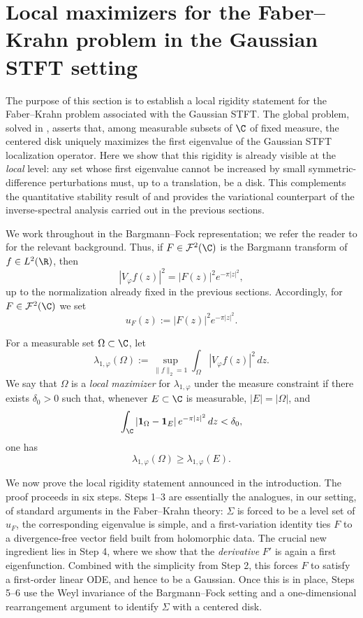 \section{Local maximizers for the Faber--Krahn problem in the Gaussian STFT setting}\label{sec:local-max}

The purpose of this section is to establish a local rigidity statement for the
Faber--Krahn problem associated with the Gaussian STFT. The global problem,
solved in \cite{Nicola-Tilli}, asserts that, among measurable subsets of \(\C\)
of fixed measure, the centered disk uniquely maximizes the first eigenvalue of
the Gaussian STFT localization operator. Here we show that this rigidity is
already visible at the \emph{local} level: any set whose first eigenvalue cannot
be increased by small symmetric-difference perturbations must, up to a
translation, be a disk. This complements the quantitative stability result of
\cite{Gomez-Guerra-Ramos-Tilli} and provides the variational counterpart of the
inverse-spectral analysis carried out in the previous sections.

We work throughout in the Bargmann--Fock representation; we refer the reader to
\cite{Bargmann,Folland,Grochenig} for the relevant background. Thus, if
\(F\in \mathcal F^2(\C)\) is the Bargmann transform of \(f\in L^2(\R)\), then
\[
|V_\varphi f(z)|^2 = |F(z)|^2 e^{-\pi |z|^2},
\]
up to the normalization already fixed in the previous sections. Accordingly, for
\(F\in \mathcal F^2(\C)\) we set
\[
u_F(z):=|F(z)|^2 e^{-\pi |z|^2}.
\]

For a measurable set \(\Omega\subset \C\), let
\[
\lambda_{1,\varphi}(\Omega)
:=
\sup_{\|f\|_2=1}\int_\Omega |V_\varphi f(z)|^2\,dz.
\]
We say that \(\Omega\) is a \emph{local maximizer} for \(\lambda_{1,\varphi}\) under the
measure constraint if there exists \(\delta_0>0\) such that, whenever
\(E\subset \C\) is measurable, \(|E|=|\Omega|\), and
\[
\int_\C |\mathbf 1_\Omega-\mathbf 1_E|\,e^{-\pi |z|^2}\,dz<\delta_0,
\]
one has
\[
\lambda_{1,\varphi}(\Omega)\ge \lambda_{1,\varphi}(E).
\]

We now prove the local rigidity statement announced in the introduction. The
proof proceeds in six steps. Steps 1--3 are essentially the analogues, in our
setting, of standard arguments in the Faber--Krahn theory: \(\Sigma\) is forced
to be a level set of \(u_F\), the corresponding eigenvalue is simple, and a
first-variation identity ties \(F\) to a divergence-free vector field built from
holomorphic data. The crucial new ingredient lies in Step 4, where we show that
the \emph{derivative} \(F'\) is again a first eigenfunction. Combined with the
simplicity from Step 2, this forces \(F\) to satisfy a first-order linear ODE,
and hence to be a Gaussian. Once this is in place, Steps 5--6 use the Weyl
invariance of the Bargmann--Fock setting and a one-dimensional rearrangement
argument to identify \(\Sigma\) with a centered disk.

